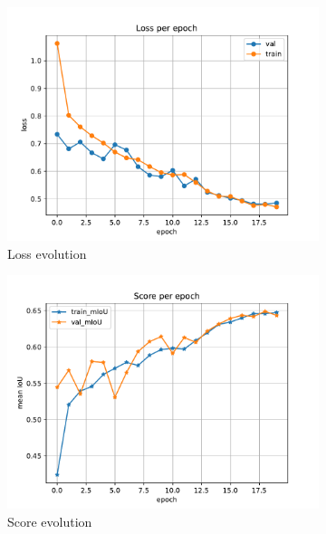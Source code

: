 \documentclass[10pt, a4paper]{article}
\begin{document}
\begin{figure}[htpb]
  \centering
  \begin{subfigure}[b]{0.32\textwidth}
      \centering
      \includegraphics[width=\textwidth]{images/Patch32_imagenet_loss.pdf}
      \caption{Loss evolution}
      \label{fig:q1a_loss}
  \end{subfigure}
  \hfill
  \begin{subfigure}[b]{0.32\textwidth}
    \centering
    \includegraphics[width=\textwidth]{images/Patch32_imagenet_score.pdf}
    \caption{Score evolution}
    \label{fig:q1a_score}
  \end{subfigure}
  \hfill
  \begin{subfigure}[b]{0.32\textwidth}

\end{subfigure}
\end{figure}
\end{document}
